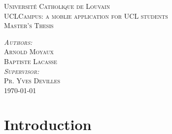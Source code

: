 \documentclass[12pt]{article} %
\begin{document}

\begin{titlepage}

\newcommand{\HRule}{\rule{\linewidth}{0.5mm}} %

\center %


\textsc{\LARGE Université Catholique de Louvain}\\[1.5cm] %
\vspace{3cm}
\textsc{\Large UCLCampus: a moblie application for UCL students}\\[0.5cm]
\textsc{\large Master's Thesis}\\[0.5cm] 
\vspace{3cm}

\textsc{\large\emph{Authors:} }\\[0.5cm] 
\textsc{\large Arnold \textsc{Moyaux}}\\[0.5cm] 
\textsc{\large Baptiste \textsc{Lacasse}}\\[0.5cm] 
\vspace{1cm}
\textsc{\large\emph{Supervisor:} }\\[0.5cm]
\textsc{\large Pr. Yves \textsc{Devilles}}\\[0.5cm]

\vspace{2cm}
{\large \today}\\[3cm] %


\vfill 

\end{titlepage}


\tableofcontents %

\newpage %


\section{Introduction} %
\end{document}
